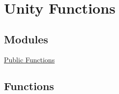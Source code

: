 \hypertarget{group___s_c___n_d_p_unity}{}\section{Unity Functions}
\label{group___s_c___n_d_p_unity}
\subsection*{Modules}
\begin{DoxyCompactItemize}
\item 
\hyperlink{group___s_c___n_d_p_pub_func}{Public Functions}
\end{DoxyCompactItemize}
\subsection*{Functions}

